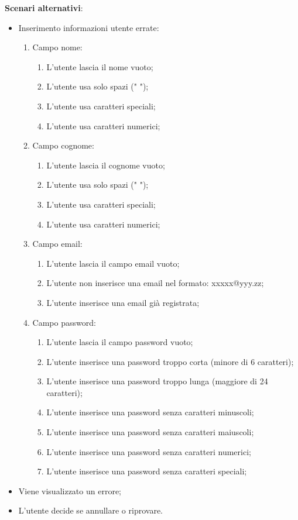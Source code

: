 \textbf{Scenari alternativi}:
\begin{itemize}
    \item Inserimento informazioni utente errate: 
    \begin{enumerate}
        \item Campo nome:
        \begin{enumerate}
            \item L'utente lascia il nome vuoto;
            \item L'utente usa solo spazi (" ");
            \item L'utente usa caratteri speciali;
            \item L'utente usa caratteri numerici;
        \end{enumerate}
        \item Campo cognome:
        \begin{enumerate}
            \item L'utente lascia il cognome vuoto;
            \item L'utente usa solo spazi (" ");
            \item L'utente usa caratteri speciali;
            \item L'utente usa caratteri numerici;
        \end{enumerate}
        \item Campo email:
        \begin{enumerate}
            \item L'utente lascia il campo email vuoto;
            \item L'utente non inserisce una email nel formato: xxxxx@yyy.zz;
            \item L'utente inserisce una email già registrata;
        \end{enumerate}
        \item Campo password:
        \begin{enumerate}
            \item L'utente lascia il campo password vuoto;
            \item L'utente inserisce una password troppo corta (minore di 6 caratteri);
            \item L'utente inserisce una password troppo lunga (maggiore di 24 caratteri);
            \item L'utente inserisce una password senza caratteri minuscoli;
            \item L'utente inserisce una password senza caratteri maiuscoli;
            \item L'utente inserisce una password senza caratteri numerici;
            \item L'utente inserisce una password senza caratteri speciali;
        \end{enumerate}
    \end{enumerate}
    \item Viene visualizzato un errore;
    \item L'utente decide se annullare o riprovare.
\end{itemize}


